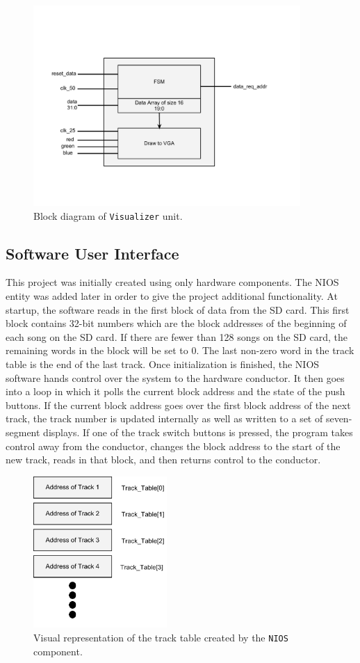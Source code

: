 \documentclass{article}
\begin{document}
\begin{figure}[H]
	\centering
	\includegraphics[width=4in]{viz_block_diagram}
	\caption{Block diagram of \texttt{Visualizer} unit.}
\end{figure}

\subsection{Software User Interface}

This project was initially created using only hardware components. The NIOS 
entity was added later in order to give the project additional functionality. 
At startup, the software reads in the first block of data from the SD card. 
This first block contains 32-bit numbers which are the block addresses of the 
beginning of each song on the SD card. If there are fewer than 128 songs on the 
SD card, the remaining words in the block will be set to 0. The last non-zero 
word in the track table is the end of the last track. Once initialization is
finished, the NIOS software hands control over the system to the hardware
conductor. It then goes into a loop in which it polls the current block address
and the state of the push buttons. If the current block address goes over the 
first block address of the next track, the track number is updated internally
as well as written to a set of seven-segment displays. If one of the track 
switch buttons is pressed, the program takes control away from the conductor,
changes the block address to the start of the new track, reads in that block,
and then returns control to the conductor.
\begin{figure}[H]
  \centering
    \includegraphics[width=2in]{track_table_diagram}
  \caption{Visual representation of the track table created by the \texttt{NIOS} 
component.}
\end{figure}
\end{document}
